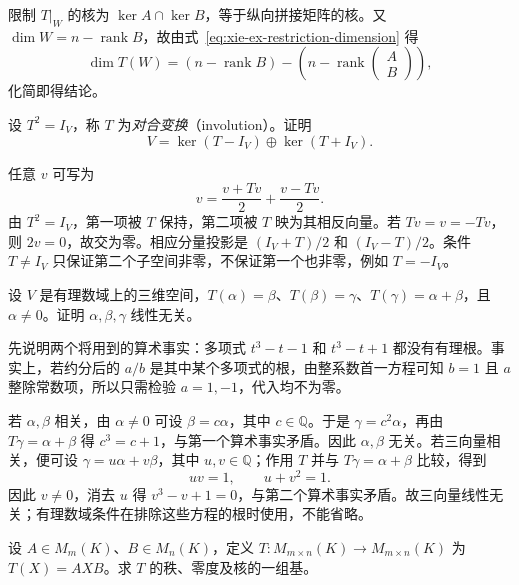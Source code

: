 \begin{solve}
限制 $T|_W$ 的核为 $\ker A\cap\ker B$，等于纵向拼接矩阵的核。又 $\dim W=n-\operatorname{rank}B$，故由式~\eqref{eq:xie-ex-restriction-dimension} 得
\[
    \dim T(W)=(n-\operatorname{rank}B)
    -\left(n-\operatorname{rank}\begin{pmatrix}A\\B\end{pmatrix}\right),
\]
化简即得结论。
\end{solve}

\begin{example}
\label{ex:xie-ex-involution}
设 $T^2=I_V$，称 $T$ 为\emph{对合变换}（involution）。证明
\[
    V=\ker(T-I_V)\oplus\ker(T+I_V).
\]
\end{example}

\begin{solve}
任意 $v$ 可写为
\[
    v=\frac{v+Tv}{2}+\frac{v-Tv}{2}.
\]
由 $T^2=I_V$，第一项被 $T$ 保持，第二项被 $T$ 映为其相反向量。若 $Tv=v=-Tv$，则 $2v=0$，故交为零。相应分量投影是 $(I_V+T)/2$ 和 $(I_V-T)/2$。条件 $T\ne I_V$ 只保证第二个子空间非零，不保证第一个也非零，例如 $T=-I_V$。
\end{solve}

\begin{example}
\label{ex:xie-ex-rational-cyclic}
设 $V$ 是有理数域上的三维空间，$T(\alpha)=\beta$、$T(\beta)=\gamma$、$T(\gamma)=\alpha+\beta$，且 $\alpha\ne0$。证明 $\alpha,\beta,\gamma$ 线性无关。
\end{example}

\begin{solve}
先说明两个将用到的算术事实：多项式 $t^3-t-1$ 和 $t^3-t+1$ 都没有有理根。事实上，若约分后的 $a/b$ 是其中某个多项式的根，由整系数首一方程可知 $b=1$ 且 $a$ 整除常数项，所以只需检验 $a=1,-1$，代入均不为零。

若 $\alpha,\beta$ 相关，由 $\alpha\ne0$ 可设 $\beta=c\alpha$，其中 $c\in\mathbb Q$。于是 $\gamma=c^2\alpha$，再由 $T\gamma=\alpha+\beta$ 得 $c^3=c+1$，与第一个算术事实矛盾。因此 $\alpha,\beta$ 无关。若三向量相关，便可设 $\gamma=u\alpha+v\beta$，其中 $u,v\in\mathbb Q$；作用 $T$ 并与 $T\gamma=\alpha+\beta$ 比较，得到
\[
    uv=1,\qquad u+v^2=1.
\]
因此 $v\ne0$，消去 $u$ 得 $v^3-v+1=0$，与第二个算术事实矛盾。故三向量线性无关；有理数域条件在排除这些方程的根时使用，不能省略。
\end{solve}

\begin{example}
\label{ex:xie-ex-rectangular-multiplication}
设 $A\in M_m(K)$、$B\in M_n(K)$，定义 $T:M_{m\times n}(K)\to M_{m\times n}(K)$ 为 $T(X)=AXB$。求 $T$ 的秩、零度及核的一组基。
\end{example}

